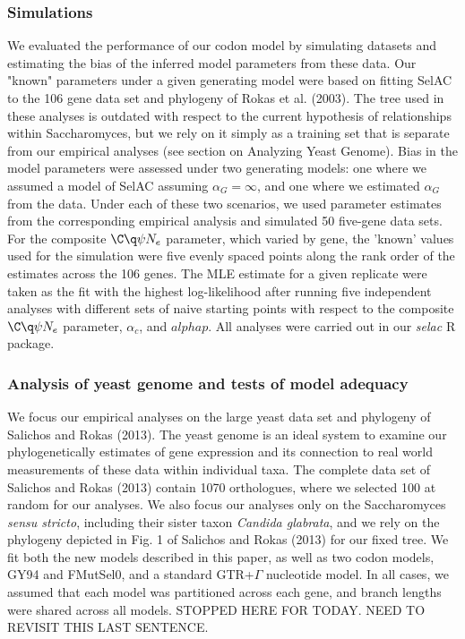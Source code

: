 \documentclass{article}
\newcommand{\Ne}{\ensuremath{{N_e}}\xspace} %
\newcommand{\alphac}{\ensuremath{\alpha_c}\xspace}
\newcommand{\alphag}{\ensuremath{\alpha_G}\xspace}
\begin{document}
\subsubsection*{Simulations}
We evaluated the performance of our codon model by simulating datasets and estimating the bias of the inferred model parameters from these data. 
Our "known" parameters under a given generating model were based on fitting SelAC to the 106 gene data set and phylogeny of Rokas et al. (2003). 
The tree used in these analyses is outdated with respect to the current hypothesis of relationships within Saccharomyces, but we rely on it simply as a training set that is separate from our empirical analyses (see section on Analyzing Yeast Genome).
Bias in the model parameters were assessed under two generating models: one where we assumed a model of SelAC assuming $\alphag = \infty$, and one where we estimated $\alphag$ from the data. 
Under each of these two scenarios, we used parameter estimates from the corresponding empirical analysis and simulated 50 five-gene data sets.
For the composite $\C\q\psi\Ne$ parameter, which varied by gene, the 'known' values used for the simulation were five evenly spaced points along the rank order of the estimates across the 106 genes.
The MLE estimate for a given replicate were taken as the fit with the highest log-likelihood after running five independent analyses with different sets of naive starting points with respect to the composite $\C\q\psi\Ne$ parameter, $\alphac$, and $alphap$.
All analyses were carried out in our \textit{selac} R package.

\subsubsection*{Analysis of yeast genome and tests of model adequacy}
We focus our empirical analyses on the large yeast data set and phylogeny of Salichos and Rokas (2013).
The yeast genome is an ideal system to examine our phylogenetically estimates of gene expression and its connection to real world measurements of these data within individual taxa.
The complete data set of Salichos and Rokas (2013) contain 1070 orthologues, where we selected 100 at random for our analyses.
We also focus our analyses only on the Saccharomyces \textit{sensu stricto}, including their sister taxon \textit{Candida glabrata}, and we rely on the phylogeny depicted in Fig. 1 of Salichos and Rokas (2013) for our fixed tree.
We fit both the new models described in this paper, as well as two codon models, GY94 and FMutSel0, and a standard GTR+$\Gamma$ nucleotide model.
In all cases, we assumed that each model was partitioned across each gene, and branch lengths were shared across all models.
STOPPED HERE FOR TODAY. NEED TO REVISIT THIS LAST SENTENCE.
\end{document}
